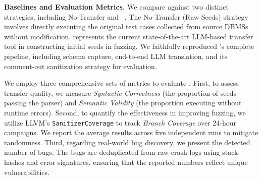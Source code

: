 \documentclass[sigconf,review,anonymous]{acmart}
\begin{document}
\begin{table}[h]
\centering
\caption{Statistics of collected open-source test cases from source DBMSs.}
\label{tab:collected_seeds}
\renewcommand\arraystretch{0.8}
\end{table}

\textbf{Baselines and Evaluation Metrics.}
We compare \tool{} against two distinct strategies, including No-Transfer and \sedar{}~\cite{fu2024sedar}. 
The No-Transfer (Raw Seeds) strategy involves directly executing the original test cases collected from source DBMSs without modification. 
\sedar{} represents the current state-of-the-art LLM-based transfer tool in constructing initial seeds in fuzzing. We faithfully reproduced \sedar{}'s complete pipeline, including schema capture, end-to-end LLM translation, and its comment-out sanitization strategy for evaluation.

We employ three comprehensive sets of metrics to evaluate \tool{}.
First, to assess transfer quality, we measure \textit{Syntactic Correctness} (the proportion of seeds passing the parser) and \textit{Semantic Validity} (the proportion executing without runtime errors). 
Second, to quantify the effectiveness in improving fuzzing, we utilize LLVM's \texttt{SanitizerCoverage} to track \textit{Branch Coverage} over 24-hour campaigns. We report the average results across five independent runs to mitigate randomness. 
Third, regarding real-world bug discovery, we present the detected number of bugs. 
The bugs are deduplicated from raw crash logs using stack hashes and error signatures, ensuring that the reported numbers reflect unique vulnerabilities.

\end{document}
